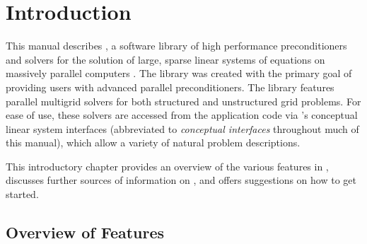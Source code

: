 
\chapter{Introduction}
\label{ch-Introduction}

This manual describes \hypre{}, a software library of high performance
preconditioners and solvers for the solution of large, sparse linear systems of
equations on massively parallel computers \cite{RDFalgout_JEJones_UMYang_2004TA}.  The \hypre{} library was created
with the primary goal of providing users with advanced parallel preconditioners.
The library features parallel multigrid solvers for both structured and
unstructured grid problems.  For ease of use, these solvers are accessed from
the application code via \hypre{}'s conceptual linear system interfaces \cite{RDFalgout_JEJones_UMYang_2005a}
(abbreviated to {\em conceptual interfaces} throughout much of this manual),
which allow a variety of natural problem descriptions.

This introductory chapter provides an overview of the various features in
\hypre{}, discusses further sources of information on \hypre{}, and
offers suggestions on how to get started.


\section{Overview of Features}
\label{Features}

